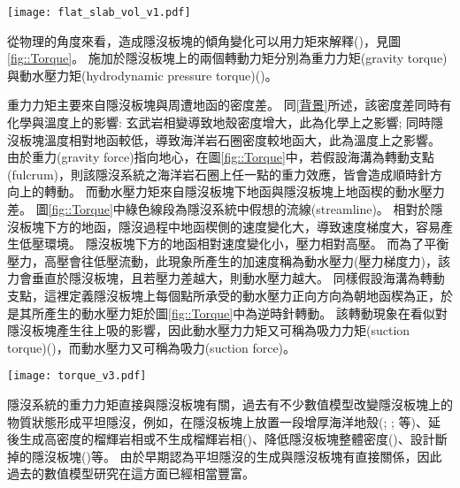 \begin{figure*}[hp]
    \centering
    \texttt{[image: flat\_slab\_vol\_v1.pdf]}
    \caption[研究區域板塊構造圖]{研究區域板塊構造圖，灰色實線為板塊邊界，資料來自\citealp{bird2003updated}，橘紅色三角形為火山分佈，資料來自\citealp{venzke2013global}，黑色虛線為每50公里深之板塊等深度線，其中50、100與150公里等深度線加粗，資料來自\citealp{hayes2018slab2}。黃色框框圈起處為平坦隱沒位置，由北到南分別位於墨西哥、秘魯與智利。
    }
    \label{fig::flat_slab_vol}
\end{figure*}

從物理的角度來看，造成隱沒板塊的傾角變化可以用力矩來解釋(\citealp{stevenson1977angle})，見圖\ref{fig::Torque}。
施加於隱沒板塊上的兩個轉動力矩分別為重力力矩(gravity torque)與動水壓力矩(hydrodynamic pressure torque)(\citealp{McKenzie1969})。

重力力矩主要來自隱沒板塊與周遭地函的密度差。
同\ref{背景}所述，該密度差同時有化學與溫度上的影響: 玄武岩相變導致地殼密度增大，此為化學上之影響; 同時隱沒板塊溫度相對地函較低，導致海洋岩石圈密度較地函大，此為溫度上之影響。
由於重力(gravity force)指向地心，在圖\ref{fig::Torque}中，若假設海溝為轉動支點(fulcrum)，則該隱沒系統之海洋岩石圈上任一點的重力效應，皆會造成順時針方向上的轉動。
而動水壓力矩來自隱沒板塊下地函與隱沒板塊上地函楔的動水壓力差。
圖\ref{fig::Torque}中綠色線段為隱沒系統中假想的流線(streamline)。
相對於隱沒板塊下方的地函，隱沒過程中地函楔側的速度變化大，導致速度梯度大，容易產生低壓環境。
隱沒板塊下方的地函相對速度變化小，壓力相對高壓。
而為了平衡壓力，高壓會往低壓流動，此現象所產生的加速度稱為動水壓力(壓力梯度力)，該力會垂直於隱沒板塊，且若壓力差越大，則動水壓力越大。
同樣假設海溝為轉動支點，這裡定義隱沒板塊上每個點所承受的動水壓力正向方向為朝地函楔為正，於是其所產生的動水壓力矩於圖\ref{fig::Torque}中為逆時針轉動。
該轉動現象在看似對隱沒板塊產生往上吸的影響，因此動水壓力力矩又可稱為吸力力矩(suction torque)(\citealp{tovish1978mantle})，而動水壓力又可稱為吸力(suction force)。

\begin{figure*}[ht!]
    \centering
    \texttt{[image: torque\_v3.pdf]}
    \caption[隱沒系統中施加於隱沒板塊上的轉動力矩]{隱沒系統中施加於隱沒板塊上的轉動力矩，包含重力力矩與動水壓力矩。綠色線為軟流圈(asthenosphere)中的假想流線，灰圓底紅字H代表高壓區，灰圓底藍字代表低壓區。假設海溝為支點，大於0之重力力矩在該系統中施予一順時針方向上的轉動，反之大於0之動水壓力矩施予一逆時針方向上的轉動。
    }
    \label{fig::Torque}
\end{figure*}

隱沒系統的重力力矩直接與隱沒板塊有關，過去有不少數值模型改變隱沒板塊上的物質狀態形成平坦隱沒，例如，在隱沒板塊上放置一段增厚海洋地殼(\citealp{van2002role}; \citealp{Liu2016}; \citealp{Hu2016}等)、延後生成高密度的榴輝岩相或不生成榴輝岩相(\citealp{van2002role})、降低隱沒板塊整體密度(\citealp{Gerya2009})、設計斷掉的隱沒板塊(\citealp{Liu2016})等。
由於早期認為平坦隱沒的生成與隱沒板塊有直接關係，因此過去的數值模型研究在這方面已經相當豐富。

